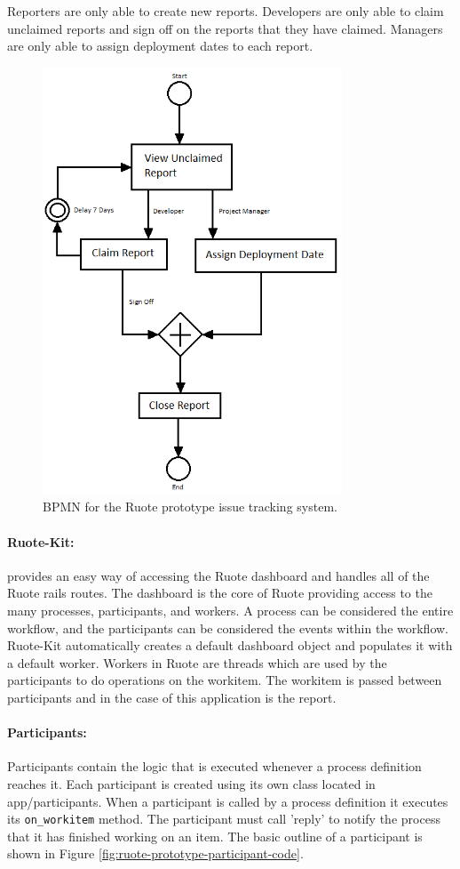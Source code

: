 \documentclass[document.tex]{subfiles}
\begin{document}
Reporters are only able to create new reports. Developers are only able to claim unclaimed reports and sign off on the reports that they have claimed. Managers are only able to assign deployment dates to each report.

\begin{figure}[!ht]
\centering \includegraphics[height=5in]{./img/prototypes/ruote-bpmn-diagram}
\caption{BPMN for the Ruote prototype issue tracking system.}
\label{fig:ruote-bpmn-diagram}
\end{figure}

\paragraph{Ruote-Kit:} provides an easy way of accessing the Ruote dashboard and handles all of the Ruote rails routes. The dashboard is the core of Ruote providing access to the many processes, participants, and workers. A process can be considered the entire workflow, and the participants can be considered the events within the workflow. Ruote-Kit automatically creates a default dashboard object and populates it with a default worker. Workers in Ruote are threads which are used by the participants to do operations on the workitem. The workitem is passed between participants and in the case of this application is the report.

\paragraph{Participants:} Participants contain the logic that is executed whenever a process definition reaches it. Each participant is created using its own class located in app\slash participants. When a participant is called by a process definition it executes its \verb!on_workitem! method. The participant must call 'reply' to notify the process that it has finished working on an item. The basic outline of a participant is shown in Figure \ref{fig:ruote-prototype-participant-code}.
\end{document}
